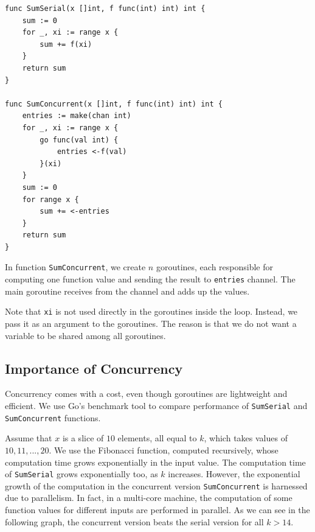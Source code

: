 \documentclass[11pt]{article}
\begin{document}
\begin{verbatim}
func SumSerial(x []int, f func(int) int) int {
	sum := 0
	for _, xi := range x {
		sum += f(xi)
	}
	return sum
}

func SumConcurrent(x []int, f func(int) int) int {
	entries := make(chan int)
	for _, xi := range x {
		go func(val int) {
			entries <-f(val)
		}(xi)
	}
	sum := 0
	for range x {
		sum += <-entries
	}
	return sum
}
\end{verbatim}
In function \texttt{SumConcurrent}, we create \(n\) goroutines, each responsible for computing one function value and sending the result to \texttt{entries} channel. The main goroutine receives from the channel and adds up the values.

Note that \texttt{xi} is not used directly in the goroutines inside the loop. Instead, we pass it as an argument to the goroutines. The reason is that we do not want a variable to be shared among all goroutines.

\subsection*{Importance of Concurrency}
\label{sec:orgheadline5}
Concurrency comes with a cost, even though goroutines are lightweight and efficient. We use Go's benchmark tool to compare performance of \texttt{SumSerial} and \texttt{SumConcurrent} functions.

Assume that \(x\) is a slice of \(10\) elements, all equal to \(k\), which takes values of \(10,11,...,20\). We use the Fibonacci function, computed recursively, whose computation time grows exponentially in the input value. The computation time of \texttt{SumSerial} grows exponentially too, as \(k\) increases. However, the exponential growth of the computation in the concurrent version \texttt{SumConcurrent} is harnessed due to parallelism. In fact, in a multi-core machine, the computation of some function values for different inputs are performed in parallel. As we can see in the following graph, the concurrent version beats the serial version for all \(k > 14\).
\end{document}
